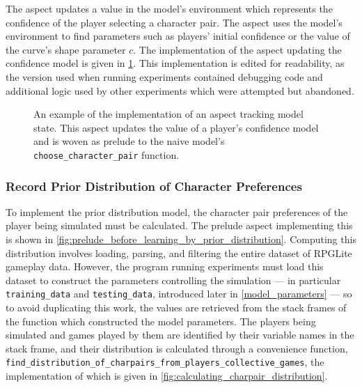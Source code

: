 The aspect updates a value in the model's environment which represents the
confidence of the player selecting a character pair. The aspect uses the model's
environment to find parameters such as players' initial confidence or the value
of the curve's shape parameter $c$. The implementation of the aspect updating
the confidence model is given in
\cref{fig:update_confidence_model_aspect_source}. This implementation is edited
for readability, as the version used when running experiments contained
debugging code and additional logic used by other experiments which were
attempted but abandoned.

\begin{figure}[h]
  \centering
  
  \caption{An example of the implementation of an aspect tracking model state.
  This aspect updates the value of a player's confidence model and is woven as
  prelude to the naive model's \lstinline{choose_character_pair} function.}
  \label{fig:update_confidence_model_aspect_source}
\end{figure}

\subsubsection{Record Prior Distribution of Character Preferences}
\label{record_prior_distribution}

To implement the prior distribution model, the character pair preferences of the
player being simulated must be calculated. The prelude aspect implementing this
is shown in \cref{fig:prelude_before_learning_by_prior_distribution}. Computing
this distribution involves loading, parsing, and filtering the entire dataset of
RPGLite gameplay data. However, the program running experiments must load this
dataset to construct the parameters controlling the simulation --- in particular
\lstinline{training_data} and \lstinline{testing_data}, introduced later in
\cref{model_parameters} --- so to avoid duplicating this work, the values are
retrieved from the stack frames of the function which constructed the model
parameters. The players being simulated and games played by them are identified
by their variable names in the stack frame, and their distribution is calculated
through a convenience function,
\lstinline{find_distribution_of_charpairs_from_players_collective_games}, the
implementation of which is given in
\cref{fig:calculating_charpair_distribution}.

